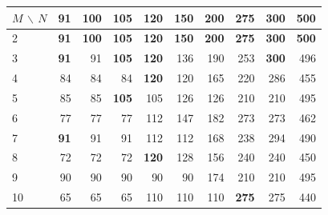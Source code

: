 \footnotesize
\begin{tabular}{lrrrrrrrrr}
\toprule
$M$ $\backslash$ $N$ & 91 & 100 & 105 & 120 & 150 & 200 & 275 & 300 & 500 \\
\midrule
2 & \textbf{91} & \textbf{100} & \textbf{105} & \textbf{120} & \textbf{150} & \textbf{200} & \textbf{275} & \textbf{300} & \textbf{500} \\
3 & \textbf{91} & 91 & \textbf{105} & \textbf{120} & 136 & 190 & 253 & \textbf{300} & 496 \\
4 & 84 & 84 & 84 & \textbf{120} & 120 & 165 & 220 & 286 & 455 \\
5 & 85 & 85 & \textbf{105} & 105 & 126 & 126 & 210 & 210 & 495 \\
6 & 77 & 77 & 77 & 112 & 147 & 182 & 273 & 273 & 462 \\
7 & \textbf{91} & 91 & 91 & 112 & 112 & 168 & 238 & 294 & 490 \\
8 & 72 & 72 & 72 & \textbf{120} & 128 & 156 & 240 & 240 & 450 \\
9 & 90 & 90 & 90 & 90 & 90 & 174 & 210 & 210 & 495 \\
10 & 65 & 65 & 65 & 110 & 110 & 110 & \textbf{275} & 275 & 440 \\
\bottomrule
\end{tabular}
